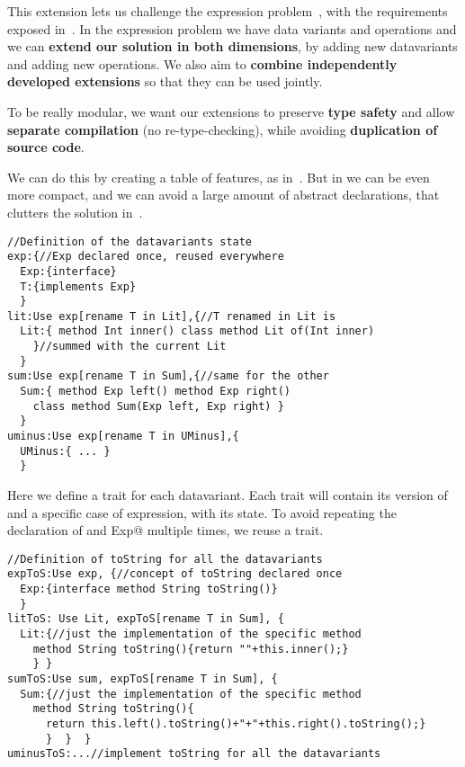 This extension lets us challenge the expression problem~\cite{wadler1998expression},
with the requirements exposed in~\cite{scala}.
In the expression problem we have data variants and operations and we can
\textbf{extend our solution in both dimensions},
by adding new datavariants and adding new operations.
We also aim to \textbf{combine independently developed extensions} so
that they can be used jointly.

To be really modular, we want our extensions to
preserve \textbf{type safety}
and allow \textbf{separate compilation} (no re-type-checking),
while avoiding \textbf{duplication of source code}.

We can do this by creating a table of features, as in~\cite{Deepfjig}.
But in \name we can be even more compact, and we can avoid a large amount of abstract declarations,
that clutters the solution in~\cite{Deepfjig}.


\begin{lstlisting}
//Definition of the datavariants state
exp:{//Exp declared once, reused everywhere
  Exp:{interface}
  T:{implements Exp}
  }
lit:Use exp[rename T in Lit],{//T renamed in Lit is 
  Lit:{ method Int inner() class method Lit of(Int inner)
    }//summed with the current Lit
  }
sum:Use exp[rename T in Sum],{//same for the other
  Sum:{ method Exp left() method Exp right()
    class method Sum(Exp left, Exp right) }
  }
uminus:Use exp[rename T in UMinus],{
  UMinus:{ ... }
  }

\end{lstlisting}
Here we define a trait for each datavariant.
Each trait will contain its version of \Q@Exp@
and a specific case of expression, with its state.
 To avoid repeating the declaration of \Q@Exp@ 
and \Q@implements Exp@ multiple times, we reuse
a \Q@exp@ trait.

\begin{lstlisting}
//Definition of toString for all the datavariants
expToS:Use exp, {//concept of toString declared once
  Exp:{interface method String toString()}
  }
litToS: Use Lit, expToS[rename T in Sum], {
  Lit:{//just the implementation of the specific method
    method String toString(){return ""+this.inner();}
    } }
sumToS:Use sum, expToS[rename T in Sum], {
  Sum:{//just the implementation of the specific method
    method String toString(){
      return this.left().toString()+"+"+this.right().toString();}
      }  }  }
uminusToS:...//implement toString for all the datavariants
\end{lstlisting}

